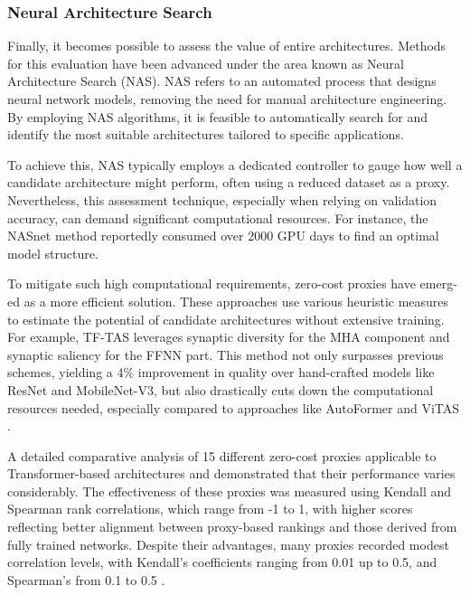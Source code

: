     \subsubsection{Neural Architecture Search}
        Finally, it becomes possible to assess the value of entire architectures. Methods for this evaluation have been advanced under the area known as Neural Architecture Search (NAS). NAS refers to an automated process that designs neural network models, removing the need for manual architecture engineering. By employing NAS algorithms, it is feasible to automatically search for and identify the most suitable architectures tailored to specific applications.

        To achieve this, NAS typically employs a dedicated controller to gauge how well a candidate architecture might perform, often using a reduced dataset as a proxy. Nevertheless, this assessment technique, especially when relying on validation accuracy, can demand significant computational resources. For instance, the NASnet method \cite{nasnet} reportedly consumed over 2000 GPU days to find an optimal model structure.

        To mitigate such high computational requirements, zero-cost proxies have emerg-ed as a more efficient solution. These approaches use various heuristic measures to estimate the potential of candidate architectures without extensive training. For example, TF-TAS \cite{tf_tas} leverages synaptic diversity for the MHA component and synaptic saliency for the FFNN part. This method not only surpasses previous schemes, yielding a 4\% improvement in quality over hand-crafted models like ResNet and MobileNet-V3, but also drastically cuts down the computational resources needed, especially compared to approaches like AutoFormer \cite{autoformer_ti} and ViTAS \cite{vitas}.

        A detailed comparative analysis of 15 different zero-cost proxies applicable to Transformer-based architectures and \llms{} \cite{LPZero} demonstrated that their performance varies considerably. The effectiveness of these proxies was measured using Kendall and Spearman rank correlations, which range from -1 to 1, with higher scores reflecting better alignment between proxy-based rankings and those derived from fully trained networks. Despite their advantages, many proxies recorded modest correlation levels, with Kendall’s coefficients ranging from 0.01 up to 0.5, and Spearman’s from 0.1 to 0.5 \cite{LPZero}.

